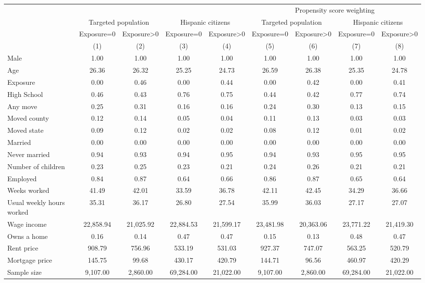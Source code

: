 \begin{tabular}{lcccccccc}
\toprule
\toprule
 & & & & & \multicolumn{4}{c}{Propensity score weighting} \\
 & \multicolumn{2}{c}{Targeted population} & \multicolumn{2}{c}{Hispanic citizens} & \multicolumn{2}{c}{Targeted population} & \multicolumn{2}{c}{Hispanic citizens}  \\
 & Exposure=0 & Exposure>0 & Exposure=0 & Exposure>0 & Exposure=0 & Exposure>0 & Exposure=0 & Exposure>0 \\
 & (1) & (2) & (3) & (4) & (5) & (6) & (7) & (8) \\
\midrule 
 Male  & 1.00 & 1.00 & 1.00 & 1.00 & 1.00 & 1.00 & 1.00 & 1.00\\
 Age  & 26.36 & 26.32 & 25.25 & 24.73 & 26.59 & 26.38 & 25.35 & 24.78\\
 Exposure  & 0.00 & 0.46 & 0.00 & 0.44 & 0.00 & 0.42 & 0.00 & 0.41\\
 High School  & 0.46 & 0.43 & 0.76 & 0.75 & 0.44 & 0.42 & 0.77 & 0.74\\
 Any move  & 0.25 & 0.31 & 0.16 & 0.16 & 0.24 & 0.30 & 0.13 & 0.15\\
 Moved county  & 0.12 & 0.14 & 0.05 & 0.04 & 0.11 & 0.13 & 0.03 & 0.03\\
 Moved state  & 0.09 & 0.12 & 0.02 & 0.02 & 0.08 & 0.12 & 0.01 & 0.02\\
 Married  & 0.00 & 0.00 & 0.00 & 0.00 & 0.00 & 0.00 & 0.00 & 0.00\\
 Never married  & 0.94 & 0.93 & 0.94 & 0.95 & 0.94 & 0.93 & 0.95 & 0.95\\
 Number of children  & 0.23 & 0.25 & 0.23 & 0.21 & 0.24 & 0.26 & 0.21 & 0.21\\
 Employed  & 0.84 & 0.87 & 0.64 & 0.66 & 0.86 & 0.87 & 0.65 & 0.64\\
 Weeks worked  & 41.49 & 42.01 & 33.59 & 36.78 & 42.11 & 42.45 & 34.29 & 36.66\\
 Usual weekly hours worked  & 35.31 & 36.17 & 26.80 & 27.54 & 35.99 & 36.03 & 27.17 & 27.07\\
 Wage income  & 22,858.94 & 21,025.92 & 22,884.53 & 21,599.17 & 23,481.98 & 20,363.06 & 23,771.22 & 21,419.30\\
 Owns a home  & 0.16 & 0.14 & 0.47 & 0.47 & 0.15 & 0.13 & 0.48 & 0.47\\
 Rent price  & 908.79 & 756.96 & 533.19 & 531.03 & 927.37 & 747.07 & 563.25 & 520.79\\
 Mortgage price  & 145.75 & 99.68 & 430.17 & 420.79 & 144.71 & 96.56 & 460.97 & 420.29\\
 Sample size  & 9,107.00 & 2,860.00 & 69,284.00 & 21,022.00 & 9,107.00 & 2,860.00 & 69,284.00 & 21,022.00\\
\bottomrule
\bottomrule
\end{tabular}